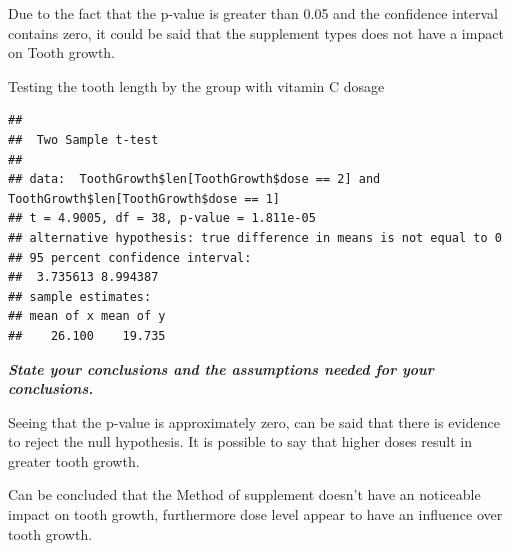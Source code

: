 \documentclass[
]{article}
\newenvironment{Shaded}{\begin{snugshade}}{\end{snugshade}}
\newcommand{\DataTypeTok}[1]{\textcolor[rgb]{0.13,0.29,0.53}{#1}}
\newcommand{\DecValTok}[1]{\textcolor[rgb]{0.00,0.00,0.81}{#1}}
\newcommand{\KeywordTok}[1]{\textcolor[rgb]{0.13,0.29,0.53}{\textbf{#1}}}
\newcommand{\NormalTok}[1]{#1}
\newcommand{\OperatorTok}[1]{\textcolor[rgb]{0.81,0.36,0.00}{\textbf{#1}}}
\newcommand{\OtherTok}[1]{\textcolor[rgb]{0.56,0.35,0.01}{#1}}
\begin{document}
Due to the fact that the p-value is greater than 0.05 and the confidence
interval contains zero, it could be said that the supplement types does
not have a impact on Tooth growth.

Testing the tooth length by the group with vitamin C dosage

\begin{Shaded}
\end{Shaded}

\begin{verbatim}
## 
##  Two Sample t-test
## 
## data:  ToothGrowth$len[ToothGrowth$dose == 2] and ToothGrowth$len[ToothGrowth$dose == 1]
## t = 4.9005, df = 38, p-value = 1.811e-05
## alternative hypothesis: true difference in means is not equal to 0
## 95 percent confidence interval:
##  3.735613 8.994387
## sample estimates:
## mean of x mean of y 
##    26.100    19.735
\end{verbatim}

\textbf{\emph{State your conclusions and the assumptions needed for your
conclusions.}}

Seeing that the p-value is approximately zero, can be said that there is
evidence to reject the null hypothesis. It is possible to say that
higher doses result in greater tooth growth.

Can be concluded that the Method of supplement doesn't have an
noticeable impact on tooth growth, furthermore dose level appear to have
an influence over tooth growth.
\end{document}

